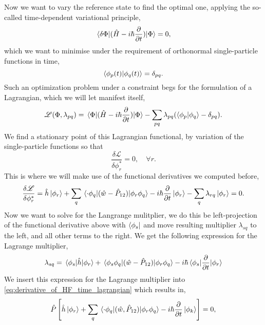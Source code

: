 Now we want to vary the reference state to find the optimal one, 
applying the so-called time-dependent variational principle,
\begin{equation}
    \mel{\delta\Phi}{(\hat{H} - i\hbar\frac{\partial}{\partial t})}{\Phi} = 0,
\end{equation}
which we want to minimise under the requirement of orthonormal single-particle functions
in time,
\begin{equation}
    \braket{\phi_p(t)}{\phi_q(t)} = \delta_{pq}.
\end{equation}
Such an optimization problem under a constraint begs for the formulation of a Lagrangian,
which we will let manifest itself,
\begin{equation}
    \mathscr{L}(\Phi, \lambda_{pq}) = 
        \mel{\Phi}{(\hat{H} - i\hbar\frac{\partial}{\partial t})}{\Phi}
        - \sum_{pq} \lambda_{pq} (\braket{\phi_p}{\phi_q} - \delta_{pq}).
\end{equation}
We find a stationary point of this Lagrangian functional, by variation of the single-particle 
functions so that 
\begin{equation}
    \frac{\delta\mathscr{L}}{\delta \phi_r^*} = 0, \quad \forall r.
\end{equation}
This is where we will make use of the functional derivatives we computed before,
\begin{equation}
    \label{eq:derivative_of_HF_time_lagrangian}
    \frac{\delta\mathscr{L}}{\delta \phi_r^*}
    = \hat{h}\ket{\phi_r} 
        + \sum_q\mel{\cdot\phi_q}{(\hat{w} - \hat{P}_{12})}{\phi_r\phi_q}
        - i\hbar\frac{\partial}{\partial t} \ket{\phi_r}
        - \sum_q \lambda_{rq} \ket{\phi_r} = 0.
\end{equation}
Now we want to solve for the Langrange mulitplier, we do this be left-projection of the 
functional derivative above with $\bra{\phi_s}$ and move resulting multiplier $\lambda_{sq}$
to the left, and all other terms to the right. We 
get the following expression for the Lagrange multiplier,
\begin{equation}
    \lambda_{sq} = \mel{\phi_s}{\hat{h}}{\phi_r} 
        + \mel{\phi_s\phi_q}{(\hat{w} - \hat{P}_{12})}{\phi_r\phi_q}
        - i\hbar \mel{\phi_s}{\frac{\partial}{\partial t}}{\phi_r}
\end{equation}
We insert this expression for the Lagrange multiplier into \autoref{eq:derivative_of_HF_time_lagrangian}
which results in,
\begin{equation}
    \label{eq:projected_time_hf_eqn}
    \hat{P}\left[\hat{h}\ket{\phi_r}
        + \sum_q\mel{\cdot\phi_q}{(\hat{w}, \hat{P}_{12})}{\phi_r\phi_q}
        - i\hbar\frac{\partial}{\partial t} \ket{\phi_k}\right] = 0,
\end{equation}
